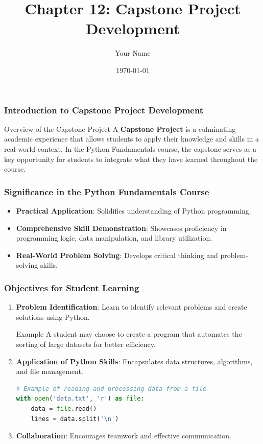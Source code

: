 \documentclass{beamer}
\title{Chapter 12: Capstone Project Development}
\author{Your Name}
\institute{Your Institution}
\date{\today}
\begin{document}
\frame{\titlepage}

\begin{frame}[fragile]
    \frametitle{Introduction to Capstone Project Development}
    \begin{block}{Overview of the Capstone Project}
        A \textbf{Capstone Project} is a culminating academic experience that allows students to apply their knowledge and skills in a real-world context. In the Python Fundamentals course, the capstone serves as a key opportunity for students to integrate what they have learned throughout the course.
    \end{block}
\end{frame}

\begin{frame}[fragile]
    \frametitle{Significance in the Python Fundamentals Course}
    \begin{itemize}
        \item \textbf{Practical Application}: Solidifies understanding of Python programming.
        \item \textbf{Comprehensive Skill Demonstration}: Showcases proficiency in programming logic, data manipulation, and library utilization.
        \item \textbf{Real-World Problem Solving}: Develops critical thinking and problem-solving skills.
    \end{itemize}
\end{frame}

\begin{frame}[fragile]
    \frametitle{Objectives for Student Learning}
    \begin{enumerate}
        \item \textbf{Problem Identification}: Learn to identify relevant problems and create solutions using Python.
        \begin{block}{Example}
            A student may choose to create a program that automates the sorting of large datasets for better efficiency.
        \end{block}
        
        \item \textbf{Application of Python Skills}: Encapsulates data structures, algorithms, and file management.
        \begin{lstlisting}[language=Python]
# Example of reading and processing data from a file
with open('data.txt', 'r') as file:
    data = file.read()
    lines = data.split('\n')
            \end{lstlisting}
        
        \item \textbf{Collaboration}: Encourages teamwork and effective communication.
    \end{enumerate}
\end{frame}
\end{document}
